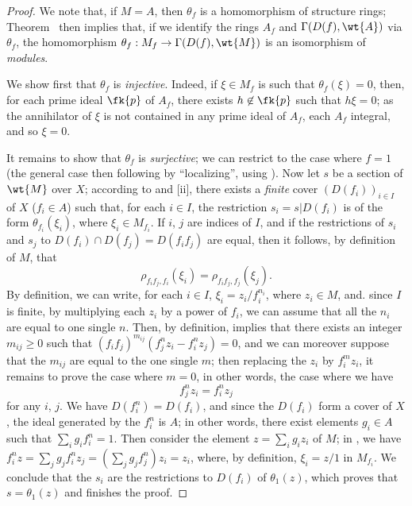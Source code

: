 \begin{proof}
\label{proof-1.1.3.7}
We note that, if $M=A$, then $\theta_f$ is a homomorphism of structure rings;
Theorem~ then implies that, if we identify the rings $A_f$ and $\Gamma(D(f),\wt{A})$ via $\theta_f$, the homomorphism $\theta_f:M_f\to\Gamma(D(f),\wt{M})$ is an isomorphism of \emph{modules}.

We show first that $\theta_f$ is \emph{injective}.
Indeed, if $\xi\in M_f$ is such that $\theta_f(\xi)=0$, then, for each prime ideal $\fk{p}$ of $A_f$, there exists $h\not\in\fk{p}$ such that $h\xi=0$;
as the annihilator of $\xi$ is not contained in any prime ideal of $A_f$, each $A_f$ integral, and so $\xi=0$.

It remains to show that $\theta_f$ is \emph{surjective};
we can restrict to the case where $f=1$ (the general case then following by ``localizing'', using ).
Now let $s$ be a section of $\wt{M}$ over $X$;
according to  and [ii], there exists a \emph{finite} cover $(D(f_i))_{i\in I}$ of $X$ ($f_i\in A$) such that, for each $i\in I$, the restriction $s_i=s|D(f_i)$ is of the form $\theta_{f_i}(\xi_i)$, where $\xi_i\in M_{f_i}$.
If $i$, $j$ are indices of $I$, and if the restrictions of $s_i$ and $s_j$ to $D(f_i)\cap D(f_j)=D(f_i f_j)$ are equal, then it follows, by definition of $M$, that
\begin{equation*}
  \label{1.1.3.7.1}
  \rho_{f_i f_j,f_i}(\xi_i)=\rho_{f_i f_j,f_j}(\xi_j).
  \tag{1.3.7.1}
\end{equation*}
By definition, we can write, for each $i\in I$, $\xi_i=z_i/f_i^{n_i}$, where $z_i\in M$, and. since $I$ is finite, by multiplying each $z_i$ by a power of $f_i$, we can assume that all the $n_i$ are equal to one single $n$.
Then, by definition,  implies that there exists an integer $m_{ij}\geq 0$ such that $(f_i f_j)^{m_{ij}}(f_j^n z_i-f_i^n z_j)=0$, and we can moreover suppose that the $m_{ij}$ are equal to the one single $m$;
then replacing the $z_i$ by $f_i^m z_i$, it remains to prove the case where $m=0$, in other words, the case where we have
\begin{equation*}
  \label{1.1.3.7.2}
  f_j^n z_i=f_i^n z_j
  \tag{1.3.7.2}
\end{equation*}
for any $i$, $j$.
We have $D(f_i^n)=D(f_i)$, and since the $D(f_i)$ form a cover of $X$, the ideal generated by the $f_i^n$ is $A$;
in other words, there exist elements $g_i\in A$ such that $\sum_i g_i f_i^n=1$.
Then consider the element $z=\sum_i g_i z_i$ of $M$;
in , we have $f_i^n z=\sum_j g_j f_i^n z_j=(\sum_j g_j f_j^n)z_i=z_i$, where, by definition, $\xi_i=z/1$ in $M_{f_i}$.
We conclude
that the $s_i$ are the restrictions to $D(f_i)$ of $\theta_1(z)$, which proves that $s=\theta_1(z)$ and finishes the proof.
\end{proof}


